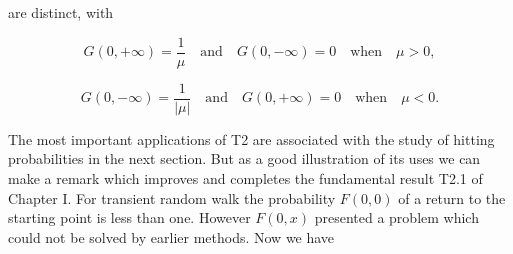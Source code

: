 are distinct, with

$$G(0, +\infty) = \frac{1}{\mu} \quad \text{and} \quad G(0, -\infty) = 0 \quad \text{when} \quad \mu > 0,$$

$$G(0, -\infty) = \frac{1}{|\mu|} \quad \text{and} \quad G(0, +\infty) = 0 \quad \text{when} \quad \mu < 0.$$

The most important applications of T2 are associated with the study of hitting probabilities in the next section. But as a good illustration of its uses we can make a remark which improves and completes the fundamental result T2.1 of Chapter I. For transient random walk the probability $F(0,0)$ of a return to the starting point is less than one. However $F(0,x)$ presented a problem which could not be solved by earlier methods. Now we have